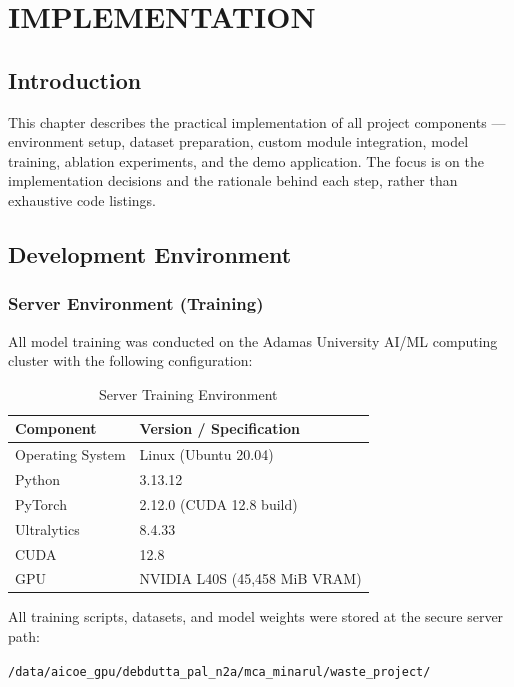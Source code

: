 \chapter{IMPLEMENTATION}

\section{Introduction}

This chapter describes the practical implementation of all project components — environment setup, dataset preparation, custom module integration, model training, ablation experiments, and the demo application. The focus is on the implementation decisions and the rationale behind each step, rather than exhaustive code listings.

\section{Development Environment}

\subsection{Server Environment (Training)}

All model training was conducted on the Adamas University AI/ML computing cluster with the following configuration:

\begin{table}[H]
\centering
\caption{Server Training Environment}
\label{tab:server_env}
\begin{tabular}{ll}
\toprule
\textbf{Component} & \textbf{Version / Specification} \\
\midrule
Operating System   & Linux (Ubuntu 20.04) \\
Python             & 3.13.12 \\
PyTorch            & 2.12.0 (CUDA 12.8 build) \\
Ultralytics        & 8.4.33 \\
CUDA               & 12.8 \\
GPU                & NVIDIA L40S (45,458 MiB VRAM) \\
\bottomrule
\end{tabular}
\end{table}

All training scripts, datasets, and model weights were stored at the secure server path:
\begin{center}
\texttt{/data/aicoe\_gpu/debdutta\_pal\_n2a/mca\_minarul/waste\_project/}
\end{center}

